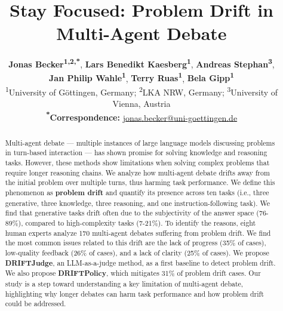 \documentclass[11pt]{article}
\title{Stay Focused: Problem Drift in Multi-Agent Debate}
\author{
 \textbf{Jonas Becker\textsuperscript{1,2,*}},
 \textbf{Lars Benedikt Kaesberg\textsuperscript{1}},
 \textbf{Andreas Stephan\textsuperscript{3}},\\
 \textbf{Jan Philip Wahle\textsuperscript{1}},
 \textbf{Terry Ruas\textsuperscript{1}},
 \textbf{Bela Gipp\textsuperscript{1}}
\\
 \textsuperscript{1}University of Göttingen, Germany; \textsuperscript{2}LKA NRW, Germany; \textsuperscript{3}University of Vienna, Austria
\\
 \small{
   \textbf{\textsuperscript{*}Correspondence:} \href{mailto:jonas.becker@uni-goettingen.de}{jonas.becker@uni-goettingen.de}
 }
}
\newcommand{\judge}{\textbf{DRIFTJudge}}
\newcommand{\policy}{\textbf{DRIFTPolicy}}
\begin{document}
\maketitle
\AddAnnotationRef{}

\begin{abstract}
Multi-agent debate --- multiple instances of large language models discussing problems in turn-based interaction --- has shown promise for solving knowledge and reasoning tasks.
However, these methods show limitations when solving complex problems that require longer reasoning chains.
We analyze how multi-agent debate drifts away from the initial problem over multiple turns, thus harming task performance.
We define this phenomenon as \textbf{problem drift} and quantify its presence across ten tasks (i.e., three generative, three knowledge, three reasoning, and one instruction-following task).
We find that generative tasks drift often due to the subjectivity of the answer space (76-89\%), compared to high-complexity tasks (7-21\%).
To identify the reasons, eight human experts analyze 170 multi-agent debates suffering from problem drift.
We find the most common issues related to this drift are the lack of progress (35\% of cases), low-quality feedback (26\% of cases), and a lack of clarity (25\% of cases).
We propose \judge, an LLM-as-a-judge method, as a first baseline to detect problem drift.
We also propose \policy, which mitigates 31\% of problem drift cases.
Our study is a step toward understanding a key limitation of multi-agent debate, highlighting why longer debates can harm task performance and how problem drift could be addressed.
\end{abstract}








%


\appendix



\clearpage

\end{document}
